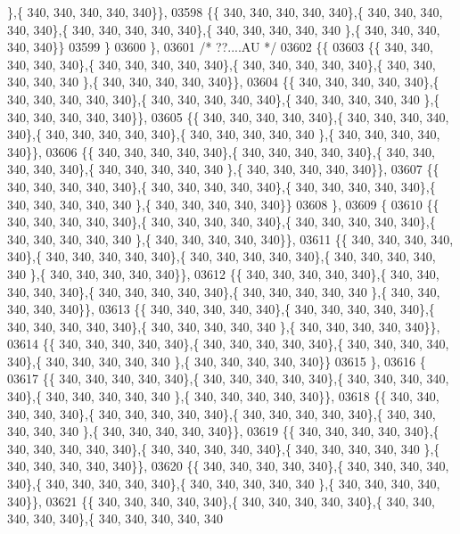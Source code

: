 \begin{DoxyCode}
      \},\{ 340, 340, 340, 340, 340\}\},
03598 \{\{ 340, 340, 340, 340, 340\},\{ 340, 340, 340, 340, 340\},\{ 340, 340, 340, 340, 340\},\{ 340, 340, 340, 340, 340
      \},\{ 340, 340, 340, 340, 340\}\}
03599 \}
03600 \},
03601 \textcolor{comment}{/* ??....AU */}
03602 \{\{
03603 \{\{ 340, 340, 340, 340, 340\},\{ 340, 340, 340, 340, 340\},\{ 340, 340, 340, 340, 340\},\{ 340, 340, 340, 340, 340
      \},\{ 340, 340, 340, 340, 340\}\},
03604 \{\{ 340, 340, 340, 340, 340\},\{ 340, 340, 340, 340, 340\},\{ 340, 340, 340, 340, 340\},\{ 340, 340, 340, 340, 340
      \},\{ 340, 340, 340, 340, 340\}\},
03605 \{\{ 340, 340, 340, 340, 340\},\{ 340, 340, 340, 340, 340\},\{ 340, 340, 340, 340, 340\},\{ 340, 340, 340, 340, 340
      \},\{ 340, 340, 340, 340, 340\}\},
03606 \{\{ 340, 340, 340, 340, 340\},\{ 340, 340, 340, 340, 340\},\{ 340, 340, 340, 340, 340\},\{ 340, 340, 340, 340, 340
      \},\{ 340, 340, 340, 340, 340\}\},
03607 \{\{ 340, 340, 340, 340, 340\},\{ 340, 340, 340, 340, 340\},\{ 340, 340, 340, 340, 340\},\{ 340, 340, 340, 340, 340
      \},\{ 340, 340, 340, 340, 340\}\}
03608 \},
03609 \{
03610 \{\{ 340, 340, 340, 340, 340\},\{ 340, 340, 340, 340, 340\},\{ 340, 340, 340, 340, 340\},\{ 340, 340, 340, 340, 340
      \},\{ 340, 340, 340, 340, 340\}\},
03611 \{\{ 340, 340, 340, 340, 340\},\{ 340, 340, 340, 340, 340\},\{ 340, 340, 340, 340, 340\},\{ 340, 340, 340, 340, 340
      \},\{ 340, 340, 340, 340, 340\}\},
03612 \{\{ 340, 340, 340, 340, 340\},\{ 340, 340, 340, 340, 340\},\{ 340, 340, 340, 340, 340\},\{ 340, 340, 340, 340, 340
      \},\{ 340, 340, 340, 340, 340\}\},
03613 \{\{ 340, 340, 340, 340, 340\},\{ 340, 340, 340, 340, 340\},\{ 340, 340, 340, 340, 340\},\{ 340, 340, 340, 340, 340
      \},\{ 340, 340, 340, 340, 340\}\},
03614 \{\{ 340, 340, 340, 340, 340\},\{ 340, 340, 340, 340, 340\},\{ 340, 340, 340, 340, 340\},\{ 340, 340, 340, 340, 340
      \},\{ 340, 340, 340, 340, 340\}\}
03615 \},
03616 \{
03617 \{\{ 340, 340, 340, 340, 340\},\{ 340, 340, 340, 340, 340\},\{ 340, 340, 340, 340, 340\},\{ 340, 340, 340, 340, 340
      \},\{ 340, 340, 340, 340, 340\}\},
03618 \{\{ 340, 340, 340, 340, 340\},\{ 340, 340, 340, 340, 340\},\{ 340, 340, 340, 340, 340\},\{ 340, 340, 340, 340, 340
      \},\{ 340, 340, 340, 340, 340\}\},
03619 \{\{ 340, 340, 340, 340, 340\},\{ 340, 340, 340, 340, 340\},\{ 340, 340, 340, 340, 340\},\{ 340, 340, 340, 340, 340
      \},\{ 340, 340, 340, 340, 340\}\},
03620 \{\{ 340, 340, 340, 340, 340\},\{ 340, 340, 340, 340, 340\},\{ 340, 340, 340, 340, 340\},\{ 340, 340, 340, 340, 340
      \},\{ 340, 340, 340, 340, 340\}\},
03621 \{\{ 340, 340, 340, 340, 340\},\{ 340, 340, 340, 340, 340\},\{ 340, 340, 340, 340, 340\},\{ 340, 340, 340, 340, 340

\end{DoxyCode}
